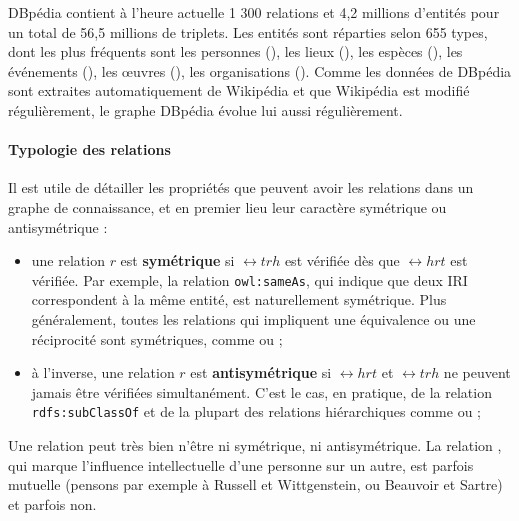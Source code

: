 DBpédia contient à l'heure actuelle 1 300 relations et 4,2 millions d'entités pour un total de 56,5 millions de triplets. Les entités sont réparties selon 655 types, dont les plus fréquents sont les personnes (), les lieux (), les espèces (), les événements (), les œuvres (), les organisations (). Comme les données de DBpédia sont extraites automatiquement de Wikipédia et que Wikipédia est modifié régulièrement, le graphe DBpédia évolue lui aussi régulièrement.


\paragraph{Typologie des relations} 

Il est utile de détailler les propriétés que peuvent avoir les relations dans un graphe de connaissance, et en premier lieu leur caractère symétrique ou antisymétrique :
\begin{itemize}
    \item une relation $r$ est \textbf{symétrique} si $\rel{t}{r}{h}$ est vérifiée dès que $\rel{h}{r}{t}$ est vérifiée. Par exemple, la relation \texttt{owl:sameAs}, qui indique que deux IRI correspondent à la même entité, est naturellement symétrique. Plus généralement, toutes les relations qui impliquent une équivalence ou une réciprocité sont symétriques, comme  ou ;
    \item à l'inverse, une relation $r$ est \textbf{antisymétrique} si $\rel{h}{r}{t}$ et $\rel{t}{r}{h}$ ne peuvent jamais être vérifiées simultanément. C'est le cas, en pratique, de la relation \texttt{rdfs:subClassOf} et de la plupart des relations hiérarchiques comme  ou ;
\end{itemize}
Une relation peut très bien n'être ni symétrique, ni antisymétrique. La relation , qui marque l'influence intellectuelle d'une personne sur un autre, est parfois mutuelle (pensons par exemple à Russell et Wittgenstein, ou Beauvoir et Sartre) et parfois non.

